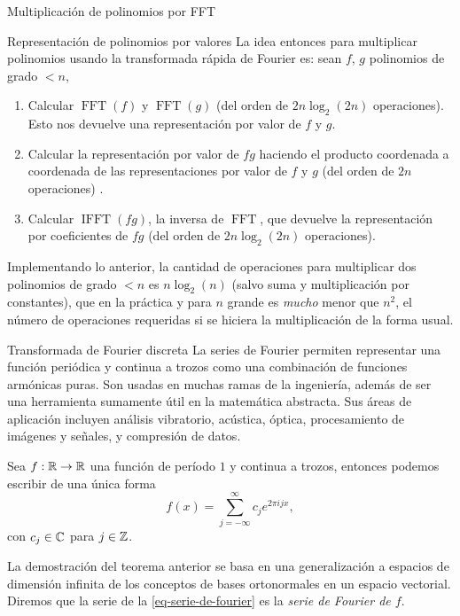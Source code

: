 \begin{chapter}{Multiplicación de polinomios por FFT}
\begin{section}{Representación de polinomios por valores}
  La idea entonces para multiplicar polinomios usando la transformada rápida de Fourier es:  sean $f$, $g$ polinomios de grado $<n$,
  \begin{enumerate}
      \item Calcular $\operatorname{FFT}(f)$ y $\operatorname{FFT}(g)$ (del orden de $2n\operatorname{log}_2(2n)$ operaciones). Esto nos devuelve una representación por valor de $f$ y $g$.
      \item Calcular  la representación por valor de $fg$ haciendo el producto coordenada a coordenada de las representaciones por valor de $f$ y $g$ (del orden de $2n$ operaciones)  .
      \item Calcular $\operatorname{IFFT}(fg)$, la inversa de $\operatorname{FFT}$, que devuelve la representación por coeficientes de $fg$ (del orden de $2n\operatorname{log}_2(2n)$ operaciones).
  \end{enumerate}

  Implementando lo anterior, la cantidad de operaciones para multiplicar dos polinomios de grado $<n$  es $n \log_2(n)$ (salvo suma y multiplicación por constantes), que en la práctica y para $n$ grande es \textit{mucho} menor que $n^2$, el número de operaciones requeridas si se hiciera la multiplicación de la forma usual.

 \end{section}

 \begin{section}{Transformada de Fourier discreta} La series de Fourier permiten representar una función periódica y continua a trozos como una combinación de funciones armónicas puras. Son usadas en muchas ramas de la ingeniería, además de ser una herramienta sumamente útil en la matemática abstracta. Sus áreas de aplicación incluyen análisis vibratorio, acústica, óptica, procesamiento de imágenes y señales, y compresión de datos.

  \begin{teorema}\label{th-series-de-fourier}
      Sea $f: \mathbb R \to \mathbb R$ una función de período $1$ y continua a trozos, entonces podemos escribir de una única forma
      \begin{equation}\label{eq-serie-de-fourier}
          f(x) = \sum_{ j= -\infty}^\infty c_j e^{2\pi ijx},
      \end{equation}
      con $c_j \in \mathbb C$ para $j \in \mathbb Z$.
  \end{teorema}
  La demostración del teorema anterior se basa en una generalización a espacios de dimensión infinita de los conceptos de bases ortonormales en un espacio vectorial. Diremos que la serie de la \eqref{eq-serie-de-fourier} es la \textit{serie de Fourier de $f$}.


\end{section}
\end{chapter}
